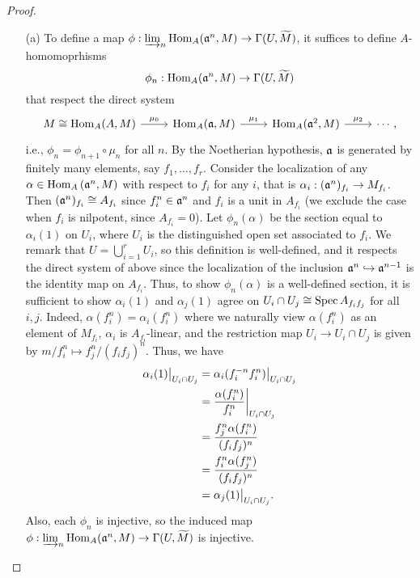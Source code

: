 \documentclass{article}
\begin{document}
\begin{enumerate} [label=\textbf{\arabic*.}, leftmargin=0em]
\begin{proof} $ $ \vspace{0pt}
\begin{itemize} [leftmargin=0cm]
\item[(a)] To define a map $\phi : \varinjlim_n \operatorname{Hom}_A(\mathfrak{a}^n, M) \to \Gamma(U, \widetilde{M})$, it suffices to define $A$-homomoprhisms $$\phi_n : \operatorname{Hom}_A(\mathfrak{a}^n, M) \to \Gamma(U, \widetilde{M})$$ that respect the direct system
\[ \begin{tikzcd}
  {M \cong \Hom_A(A, M)} \arrow[r, "\mu_0"] & {\Hom_A(\goth{a}, M)} \arrow[r, "\mu_1"] & {\Hom_A(\goth{a}^2, M)} \arrow[r, "\mu_2"] & \cdots,
  \end{tikzcd} \]
i.e., $\phi_n = \phi_{n + 1} \circ \mu_n$ for all $n$.
By the Noetherian hypothesis, $\mathfrak{a}$ is generated by finitely many elements, say $f_1, \dots, f_r$.
Consider the localization of any $\alpha \in \operatorname{Hom}_A{(\mathfrak{a}^n, M)}$ with respect to $f_i$ for any $i$, that is $\alpha_i : (\mathfrak{a}^n)_{f_i}\to M_{f_i}$.
Then $(\mathfrak{a}^n)_{f_i} \cong A_{f_i}$ since $f_i^n \in \mathfrak{a}^n$ and $f_i$ is a unit in $A_{f_i}$ (we exclude the case when $f_i$ is nilpotent, since $A_{f_i} = 0$).
Let $\phi_n(\alpha)$ be the section equal to $\alpha_i(1)$ on $U_i$, where $U_i$ is the distinguished open set associated to $f_i$.
We remark that $U = \bigcup_{i = 1}^r U_i$, so this definition is well-defined, and it respects the direct system of above since the localization of the inclusion $\mathfrak{a}^{n} \hookrightarrow \mathfrak{a}^{n - 1}$ is the identity map on $A_{f_i}$.
Thus, to show $\phi_n(\alpha)$ is a well-defined section, it is sufficient to show $\alpha_i(1)$ and $\alpha_j(1)$ agree on $U_i \cap U_j \cong \operatorname{Spec}{A_{f_if_j}}$ for all $i, j$.
Indeed, $\alpha(f_i^n) = \alpha_i(f_i^n)$ where we naturally view $\alpha(f_i^n)$ as an element of $M_{f_i}$, $\alpha_i$ is $A_{f_i}$-linear, and the restriction map $U_i \to U_i \cap U_j$ is given by $m/f_i^n \mapsto f_j^n/(f_if_j)^n$.
Thus, we have
\begin{align*}
  \restr{\alpha_i(1)}{U_i \cap U_j} & = \restr{\alpha_i(f_i^{-n}f_i^n)}{U_i \cap U_j} \\
  & = \restr{\frac{\alpha(f_i^n)}{f_i^n}}{U_i \cap U_j} \\
  & = \frac{f_j^n \alpha(f_i^n)}{(f_if_j)^n} \\
  & = \frac{f_i^n \alpha(f_j^n)}{(f_if_j)^n} \\
  & = \restr{\alpha_j(1)}{U_i \cap U_j}.
\end{align*}
Also, each $\phi_n$ is injective, so the induced map $\phi : \varinjlim_n \operatorname{Hom}_A(\mathfrak{a}^n, M) \to \Gamma(U, \widetilde{M})$ is injective.

\end{itemize}
\end{proof}
\end{enumerate}
\end{document}
